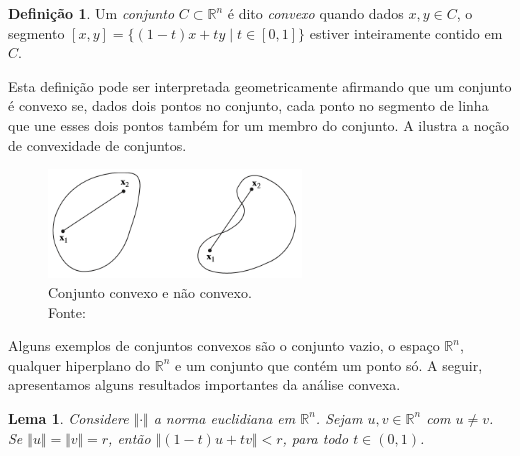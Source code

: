\documentclass[12pt,a4paper]{scrartcl}
\def\RR{\mathds{R}}
\newtheorem{lema}{Lema}
\theoremstyle{definition}%
\newtheorem{defi}{Definição}
\begin{document}
\begin{defi} 
Um \emph{conjunto} $C \subset \RR^{n}$ é dito \emph{convexo} quando dados $x,y \in C$, o segmento $[x,y] = \{ (1-t)x + ty \mid t\in [0,1] \}$ estiver inteiramente contido em $C$.
\end{defi}

Esta definição pode ser interpretada geometricamente afirmando que um conjunto é convexo se, dados dois pontos no conjunto, cada ponto no segmento de linha que une esses dois pontos também for um membro do conjunto. A  ilustra a noção de convexidade de conjuntos.


\begin{figure}[!h] 
	\centering
	\includegraphics[width=0.60\textwidth]{convexidade}
	\caption{ Conjunto convexo e não convexo. \label{fig:conjuntos_convexos} \\ Fonte: \textcite{Luenberger:2016}}
\end{figure}


Alguns exemplos de conjuntos convexos são o conjunto vazio, o espaço $\RR^{n}$, qualquer hiperplano do $\RR^{n}$ e um conjunto que contém um ponto só. A seguir, apresentamos alguns resultados importantes da análise convexa.

\begin{lema} \label{lema:1_convexidade}
Considere $\Vert \cdot \Vert$ a norma euclidiana em $\RR^{n}$. Sejam $u,v \in \RR^{n}$ com $u\neq v$. Se $\Vert u \Vert = \Vert v \Vert = r$, então $\Vert (1-t)u + tv \Vert < r$, para todo $t \in (0,1)$.
\end{lema}
\end{document}
